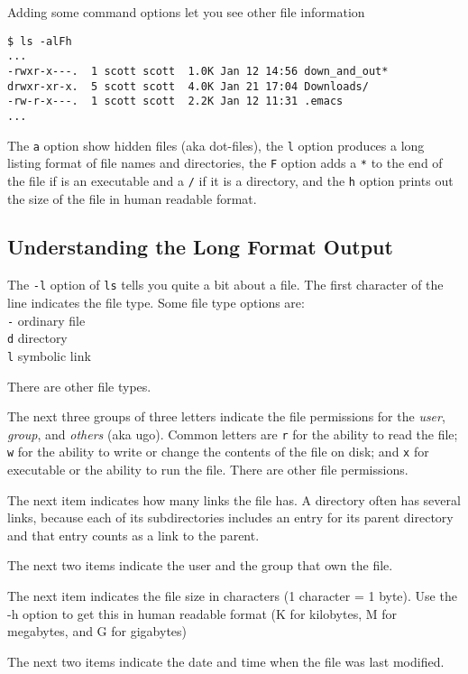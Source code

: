 \documentclass[11pt]{cselabheader}
\begin{document}
Adding some command options let you see other file information

\begin{lstlisting}[style=bash]
$ ls -alFh 
...
-rwxr-x---.  1 scott scott  1.0K Jan 12 14:56 down_and_out*
drwxr-xr-x.  5 scott scott  4.0K Jan 21 17:04 Downloads/
-rw-r-x---.  1 scott scott  2.2K Jan 12 11:31 .emacs
...
\end{lstlisting}

The \texttt{a} option show hidden files (aka dot-files), the \texttt{l} option
produces a long listing format of file names and directories, the \texttt{F}
option adds a \texttt{*} to the end of the file if is an executable and a
\texttt{/} if it is a directory, and the \texttt{h} option prints out the size
of the file in human readable format.

\subsection*{Understanding the Long Format Output}

The \texttt{-l} option of \texttt{ls} tells you quite a bit about a file. The
first character of the line indicates the file type. Some file type options are:
\\\texttt{-} ordinary file
\\\texttt{d} directory
\\\texttt{l} symbolic link

There are other file types.

The next three groups of three letters indicate the file permissions for the
\emph{user}, \emph{group}, and \emph{others} (aka ugo). Common letters are
\texttt{r} for the ability to read the file; \texttt{w} for the ability to write
or change the contents of the file on disk; and \texttt{x} for executable or the
ability to run the file. There are other file permissions.

The next item indicates how many links the file has. A directory often has
several links, because each of its subdirectories includes an entry for its
parent directory and that entry counts as a link to the parent.

The next two items indicate the user and the group that own the file.

The next item indicates the file size in characters (1 character = 1 byte). Use
the -h option to get this in human readable format (K for kilobytes, M for
megabytes, and G for gigabytes)

The next two items indicate the date and time when the file was last modified.
\end{document}
